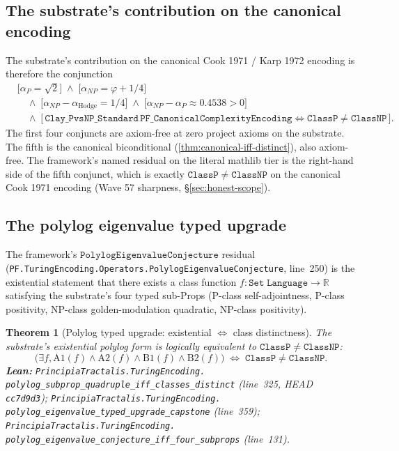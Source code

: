 \documentclass[11pt,a4paper]{article}
\theoremstyle{plain}
\newtheorem{theorem}{Theorem}[section]
\theoremstyle{definition}
\begin{document}
\subsection{The substrate's contribution on the canonical encoding}
\label{sec:substrate-contribution}

The substrate's contribution on the canonical Cook 1971 / Karp 1972
encoding is therefore the conjunction
\[
\begin{aligned}
&\bigl[\alpha_{P} = \sqrt{2}\bigr] \;\wedge\;
\bigl[\alpha_{NP} = \varphi + 1/4\bigr]
\\
&\quad \wedge\;
\bigl[\alpha_{NP} - \alpha_{\mathrm{Hodge}} = 1/4\bigr] \;\wedge\;
\bigl[\alpha_{NP} - \alpha_{P} \approx 0.4538 > 0\bigr] \\
&\quad \wedge\;
\bigl[\,\mathtt{Clay\_PvsNP\_Standard}\,
\mathtt{PF\_CanonicalComplexityEncoding} \Leftrightarrow \mathtt{ClassP} \neq \mathtt{ClassNP}\,\bigr].
\end{aligned}
\]
The first four conjuncts are axiom-free at zero project axioms on the
substrate. The fifth is the canonical biconditional
(\cref{thm:canonical-iff-distinct}), also axiom-free. The framework's
named residual on the literal mathlib tier is the right-hand side of
the fifth conjunct, which is exactly $\mathtt{ClassP} \neq
\mathtt{ClassNP}$ on the canonical Cook 1971 encoding (Wave 57
sharpness, \S\ref{sec:honest-scope}).

\subsection{The polylog eigenvalue typed upgrade}
\label{sec:polylog-typed-upgrade}

The framework's $\mathtt{PolylogEigenvalueConjecture}$ residual
(\texttt{PF.TuringEncoding.Operators.PolylogEigenvalueConjecture},
line~250) is the existential statement that there exists a class
function $f : \mathtt{Set\;Language} \to \mathbb{R}$ satisfying the
substrate's four typed sub-Props (P-class self-adjointness, P-class
positivity, NP-class golden-modulation quadratic, NP-class
positivity).

\begin{theorem}[Polylog typed upgrade: existential
$\Leftrightarrow$ class distinctness]
\label{thm:polylog-typed-upgrade}
The substrate's existential polylog form is logically equivalent to
$\mathtt{ClassP} \neq \mathtt{ClassNP}$:
\[
\bigl(\exists f, \mathrm{A1}(f) \wedge \mathrm{A2}(f) \wedge
\mathrm{B1}(f) \wedge \mathrm{B2}(f)\bigr)
\;\Longleftrightarrow\;
\mathtt{ClassP} \neq \mathtt{ClassNP}.
\]
\textbf{Lean:}
\texttt{PrincipiaTractalis.TuringEncoding.\\
polylog\_subprop\_quadruple\_iff\_classes\_distinct}
(line~325, HEAD \texttt{cc7d9d3});
\texttt{PrincipiaTractalis.TuringEncoding.\\
polylog\_eigenvalue\_typed\_upgrade\_capstone}
(line~359);
\texttt{PrincipiaTractalis.TuringEncoding.\\
polylog\_eigenvalue\_conjecture\_iff\_four\_subprops}
(line~131).
\end{theorem}
\end{document}
